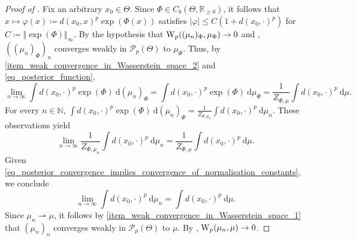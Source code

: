 \documentclass[a4paper]{scrartcl}
\theoremstyle{definition}
\numberwithin{equation}{section}
\newcommand{\R}{\mathbb{R}}
\newcommand{\N}{\mathbb{N}}
\newcommand{\rd}{\mathrm{d}}
\newcommand{\abs}[1]{\vert #1\vert}
\newcommand{\norm}[1]{\Vert #1 \Vert}
\newcommand{\Was}[0]{\textup{W}}
\begin{document}
\begin{proof}[Proof of ]
Fix an arbitrary $x_0\in\Theta$. 
Since $\Phi\in C_b(\Theta,\R_{\geq 0})$, it follows that $x\mapsto\varphi(x)\coloneqq d(x_0,x)^p\exp(\Phi(x))$ satisfies $\abs{\varphi}\leq C(1+d(x_0,\cdot)^p)$ for $C\coloneqq \norm{\exp(\Phi)}_\infty$.
By the hypothesis that $\Was_p((\mu_n)_\Phi,\mu_{\Phi})\to 0$ and \cite[Theorem 6.9]{Villani2009}, $((\mu_n)_\Phi)_n$ converges weakly in $\mathcal{P}_p(\Theta)$ to $\mu_\Phi$.
Thus, by \ref{item_weak_convergence_in_Wasserstein_space_2} and \eqref{eq_posterior_function},
\begin{equation*}
 \lim_{n\to\infty}\int d(x_0,\cdot)^p\exp(\Phi)~\rd(\mu_n)_\Phi = \int d(x_0,\cdot)^p\exp(\Phi)~\rd\mu_{\Phi}=\frac{1}{Z_{\Phi,\mu}}\int d(x_0,\cdot)^p~\rd\mu.
\end{equation*}
For every $n\in\N$, $\int d(x_0,\cdot)^p\exp(\Phi)~\rd(\mu_n)_\Phi=\frac{1}{Z_{\Phi,\mu_n}}\int d(x_0,\cdot)^p~\rd\mu_n$. 
These observations yield
\begin{equation*}
\lim_{n\to \infty}\frac{1}{Z_{\Phi,\mu_n}}\int d(x_0,\cdot)^p ~\rd\mu_n = \frac{1}{Z_{\Phi,\mu}}\int d(x_0,\cdot)^p~\rd\mu.
\end{equation*}
Given \eqref{eq_posterior_convergence_implies_convergence_of_normalisation_constants}, we conclude
\begin{equation*}
\lim_{n\to\infty}\int d(x_0,\cdot)^p~\rd\mu_n = \int d(x_0,\cdot)^p~\rd\mu.
\end{equation*}
Since $\mu_n\rightharpoonup\mu$, it follows by \ref{item_weak_convergence_in_Wasserstein_space_1} that $(\mu_n)_n$ converges weakly in $\mathcal{P}_p(\Theta)$ to $\mu$.
By \cite[Theorem 6.9]{Villani2009}, $\Was_p(\mu_n,\mu)\to 0$.
\end{proof}
\end{document}
